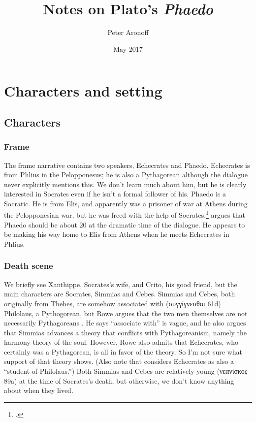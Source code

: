 \documentclass[12pt,letterpaper]{article}
\begin{document}
\begin{titlepage}
\title{Notes on Plato's \textit{Phaedo}}
\author{Peter Aronoff}
\date{May 2017}
\maketitle
\thispagestyle{empty}
\end{titlepage}

\section{Characters and setting}

\subsection{Characters}

\subsubsection{Frame}

The frame narrative contains two speakers, Echecrates and Phaedo. Echecrates is from Phlius in the Pelopponesus; he is also a Pythagorean although the dialogue never explicitly mentions this. We don't learn much about him, but he is clearly interested in Socrates even if he isn't a formal follower of his. Phaedo is a Socratic. He is from Elis, and apparently was a prisoner of war at Athens during the Pelopponesian war, but he was freed with the help of Socrates.\footcite[7]{rowe1993} \textcite[231]{nails2002-people-of-plato} argues that Phaedo should be about 20 at the dramatic time of the dialogue. He appears to be making his way home to Elis from Athens when he meets Echecrates in Phlius.

\subsubsection{Death scene}

We briefly see Xanthippe, Socrates's wife, and Crito, his good friend, but the main characters are Socrates, Simmias and Cebes. Simmias and Cebes, both originally from Thebes, are somehow associated with (\textgreek{συγγίγνεσθαι} 61d) Philolaus, a Pythogorean, but Rowe argues that the two men themselves are not necessarily Pythagoreans \parencite[7]{rowe1993}. He says ``associate with'' is vague, and he also argues that Simmias advances a theory that conflicts with Pythagoreanism, namely the harmony theory of the soul. However, Rowe also admits that Echecrates, who certainly was a Pythagorean, is all in favor of the theory. So I'm not sure what support of that theory shows. (Also note that \textcite[138]{nails2002} considers Echecrates as also a ``student of Philolaus.'') Both Simmias and Cebes are relatively young (\textgreek{νεανίσκος} 89a) at the time of Socrates's death, but otherwise, we don't know anything about when they lived.
\end{document}
